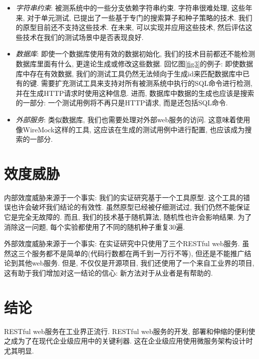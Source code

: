         \begin{itemize}
          \item \textit{字符串约束}: 被测系统中的一些分支依赖字符串约束. 字符串很难处理, 这些年来, 对于单元测试, 已提出了一些基于专门的搜索算子\cite{Alshraideh2010Search}和种子策略\cite{Rojas2016Seeding}的技术. 我们的原型目前还不支持这些技术. 在未来, 可以实现并应用这些技术, 然后评估这些技术在我们的测试场景中是否表现良好. 
            
            \item \textit{数据库}: 即使一个数据库使用有效的数据初始化, 我们的技术目前都还不能检测数据库里面有什么, 更遑论生成或修改这些数据. 回忆图\ref{fig3}的例子: 即使数据库中存在有效数据, 我们的测试工具仍然无法倾向于生成id来匹配数据库中已有的键. 需要扩充测试工具来支持对所有被测系统中执行的SQL命令进行检测, 并在生成HTTP请求时使用这种信息. 进而, 数据库中数据的生成也应该是搜索的一部分: 一个测试用例将不再只是HTTP请求, 而是还包括SQL命令. 
            
            \item \textit{外部服务}: 类似数据库, 我们也需要处理对外部web服务的访问. 这意味着使用像WireMock这样的工具, 这应该在生成的测试用例中进行配置, 也应该成为搜索的一部分. 
        \end{itemize}
        

\section{效度威胁}
  内部效度威胁来源于一个事实: 我们的实证研究基于一个工具原型. 这个工具的错误也许会破坏我们结论的有效性. 虽然原型已经被仔细测试过, 我们仍然不能保证它是完全无故障的. 而且, 我们的技术基于随机算法, 随机性也许会影响结果. 为了消除这一问题, 每个实验都使用了不同的随机种子重复30遍. 
    
    外部效度威胁来源于一个事实: 在实证研究中只使用了三个RESTful web服务. 虽然这三个服务都不是简单的(代码行数都在两千到一万行不等), 但还是不能推广结论到其他web服务. 但是, 不仅仅是开源项目, 我们还使用了一个来自工业界的项目, 这有助于我们增加对这一结论的信心: 新方法对于从业者是有帮助的. 

\section{结论}
  RESTful web服务在工业界正流行. RESTful web服务的开发, 部署和伸缩的便利使之成为了在现代企业级应用中的关键利器. 这在企业级应用使用微服务架构设计时尤其明显\cite{newman2015building}. 
    
